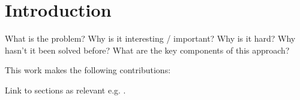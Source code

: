 \section{Introduction}\label{sec:intro}
What is the problem?
Why is it interesting / important?
Why is it hard?
Why hasn't it been solved before?
What are the key components of this approach?

This work makes the following contributions:
\begin{tightitemize}
  \item Link to
  sections as relevant e.g. .
\end{tightitemize}